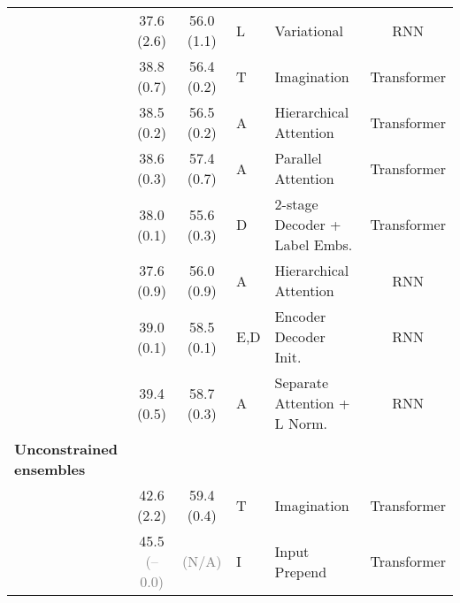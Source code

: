\documentclass{svjour3}
\newcommand{\uua}[0]{}
\newcommand{\dda}[0]{}
\newcommand{\sspn}[1]{\textcolor{ssp}{(\uua #1)}}
\newcommand{\ssmn}[1]{\textcolor{ssm}{(\dda #1)}}
\newcommand{\noc}[0]{\textcolor{gray}{(-- 0.0)}}
\newcommand{\na}[0]{\textcolor{gray}{(N/A)}}
\newcommand{\ff}[0]{}
\begin{document}
\begin{table}[t]
{\begin{tabular}{@{}lccllc@{}}
\citet{calixto-2018-latent}               & 37.6 \sspn{2.6}   & 56.0 \sspn{1.1}   & L    & Variational          & RNN \\
  \citet{helcl-libovick-varis:2018:WMT}     & 38.8 \sspn{0.7}   & 56.4 \sspn{0.2}   & T    & Imagination          & Transformer    \\
  \citet{libovicky-tfatt-2018}              & 38.5 \sspn{0.2}   & 56.5 \ssmn{0.2}   & A    & Hierarchical Attention & Transformer \\
                                            & 38.6 \sspn{0.3}   & 57.4 \sspn{0.7}   & A    & Parallel Attention     & Transformer \\
  \midrule
\citet{ive-etal-2019-distilling}          & 38.0 \sspn{0.1}   & 55.6 \ssmn{0.3}   &D\ff  & 2-stage Decoder + Label Embs.        & Transformer \\
\citet{libovicky-thesis-2019}             & 37.6 \sspn{0.9}   & 56.0 \sspn{0.9}   & A    & Hierarchical Attention  & RNN  \\
\citet{caglayan-thesis-2019}              & 39.0 \sspn{0.1}   & 58.5 \sspn{0.1}   & E,D  & Encoder Decoder Init.   &  RNN \\
                                            & 39.4 \sspn{0.5}   & 58.7 \sspn{0.3}   & A    & Separate Attention + L Norm.  & RNN \\
  \midrule
\textbf{Unconstrained ensembles}      \\ \midrule
\citet{helcl-libovick-varis:2018:WMT}     & 42.6 \sspn{2.2}   & 59.4 \sspn{0.4}   & T    & Imagination & Transformer            \\
\citet{gronroos-memad-2018}               & 45.5 \noc         & \na               & I\ff & Input  Prepend & Transformer         \\









































\bottomrule
\end{tabular}}
\end{table}
\end{document}
